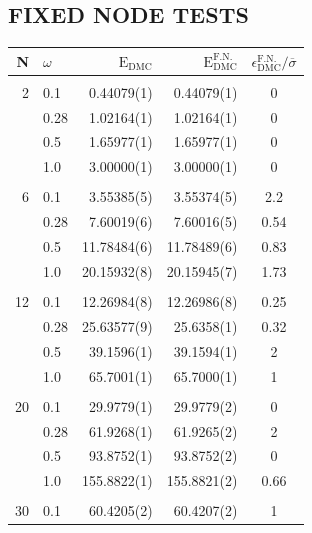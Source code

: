 \subsection{FIXED NODE TESTS}

\begin{table}
\begin{center}
\begin{tabular}{rl|rrc}
    N     & $\omega$ & $\mathrm{E_{DMC}}$ & $\mathrm{E_{DMC}^\mathrm{F.N.}}$  & $\epsilon_\mathrm{DMC}^\mathrm{F.N.}/\overline{\sigma}$ \\
\hline\hline
\multicolumn{5}{c}{} \\
    2     &   0.1    & 0.44079(1) & 0.44079(1)  & 0 \\
          &   0.28   & 1.02164(1) & 1.02164(1)  & 0 \\
          &   0.5    & 1.65977(1) & 1.65977(1)  & 0 \\
          &   1.0    & 3.00000(1) & 3.00000(1)  & 0 \\
\cline{2-5}
\multicolumn{5}{c}{} \\
    6     &   0.1    &  3.55385(5) & 3.55374(5) & 2.2  \\
          &   0.28   &  7.60019(6) & 7.60016(5) & 0.54 \\ 
          &   0.5    & 11.78484(6) & 11.78489(6)& 0.83 \\
          &   1.0    & 20.15932(8) & 20.15945(7)& 1.73 \\
\cline{2-5}
\multicolumn{5}{c}{} \\
    12    &   0.1    & 12.26984(8) & 12.26986(8)& 0.25\\
          &   0.28   & 25.63577(9) & 25.6358(1) & 0.32 \\
          &   0.5    & 39.1596(1) & 39.1594(1)  & 2 \\
          &   1.0    & 65.7001(1) & 65.7000(1)  & 1 \\
\cline{2-5}
\multicolumn{5}{c}{} \\
    20    &   0.1    &  29.9779(1) & 29.9779(2) & 0 \\
          &   0.28   &  61.9268(1) & 61.9265(2) & 2 \\
          &   0.5    &  93.8752(1) & 93.8752(2) & 0 \\
          &   1.0    & 155.8822(1) & 155.8821(2)& 0.66 \\
\cline{2-5}
\multicolumn{5}{c}{} \\
    30    &   0.1    &  60.4205(2) & 60.4207(2) & 1 \\

\end{tabular}
\end{center}
\end{table}

